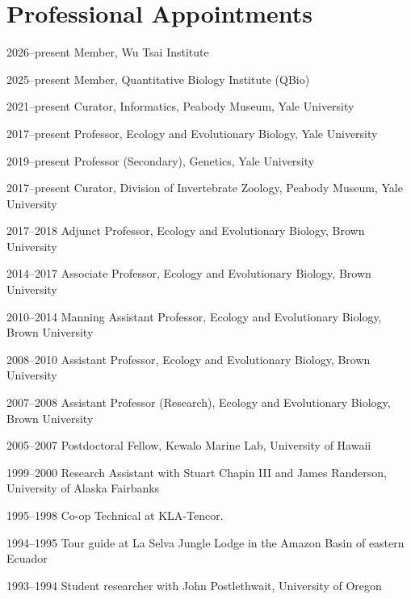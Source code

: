 \medskip
\section{Professional Appointments}

\begin{entry}{60pt}
\item [\rm 2026--present] Member, Wu Tsai Institute     
\item [\rm 2025--present] Member, Quantitative Biology Institute (QBio)    
\item [\rm 2021--present] Curator, Informatics, Peabody Museum, Yale University
\item [\rm 2017--present] Professor, Ecology and Evolutionary Biology, Yale University
\item [\rm 2019--present] Professor (Secondary), Genetics, Yale University
\item [\rm 2017--present] Curator, Division of Invertebrate Zoology, Peabody Museum, Yale University
\item [\rm 2017--2018] Adjunct Professor, Ecology and Evolutionary Biology, Brown University
\item [\rm 2014--2017]  Associate Professor, Ecology and Evolutionary Biology, Brown University
\item [\rm 2010--2014]  Manning Assistant Professor, Ecology and Evolutionary Biology, Brown University
\item [\rm 2008--2010] Assistant Professor, Ecology and Evolutionary Biology, Brown University
\item [\rm 2007--2008] Assistant Professor (Research), Ecology and Evolutionary Biology, Brown University
\item [\rm 2005--2007] Postdoctoral Fellow, Kewalo Marine Lab, University of Hawaii
\item [\rm 1999--2000] Research Assistant with Stuart Chapin III and James Randerson, University of Alaska Fairbanks
\item [\rm 1995--1998] Co-op Technical at KLA-Tencor.
\item [\rm 1994--1995] Tour guide at La Selva Jungle Lodge in the Amazon Basin of eastern Ecuador
\item [\rm 1993--1994] Student researcher with John Postlethwait, University of Oregon
\end{entry}